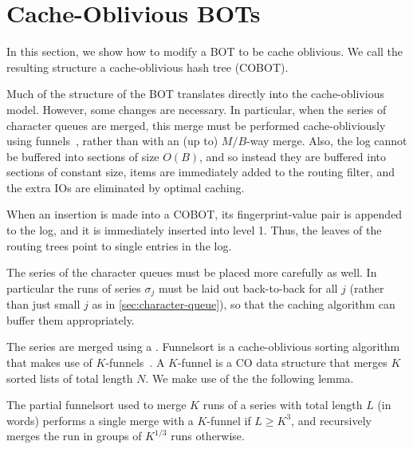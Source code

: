 \section{Cache-Oblivious BOTs}\label{sec:boa-cacheoblivious}

In this section, we show how to modify a BOT to be cache oblivious.  We call
the resulting structure a cache-oblivious hash tree (COBOT). 

Much of the structure of the BOT translates directly into the cache-oblivious
model. However, some changes are necessary. In particular, when the series of
character queues are merged, this merge must be performed cache-obliviously
using funnels~\cite{DBLP:conf/focs/FrigoLPR99}, rather than with an (up to)
$M/B$-way merge. Also, the log cannot be buffered into sections of size $O(B)$,
and so instead they are buffered into sections of constant size, items are
immediately added to the routing filter, and the extra IOs are eliminated by
optimal caching.

When an insertion is made into a COBOT, its fingerprint-value pair is
appended to the log, and it is immediately inserted into level 1. Thus, the
leaves of the routing trees point to single entries in the log.

The series of the character queues must be placed more carefully as well. In
particular the runs of series $\sigma_j$ must be laid out back-to-back for all
$j$ (rather than just small $j$ as in \cref{sec:character-queue}), so that the
caching algorithm can buffer them appropriately.

The series are merged using a . Funnelsort is a
cache-oblivious sorting algorithm that makes use of
$K$-funnels~\cite{DBLP:conf/focs/FrigoLPR99}. A $K$-funnel is a CO data structure
that merges $K$ sorted lists of total length $N$. We make use of the the
following lemma.

	
The partial funnelsort used to merge $K$ runs of a series with total length $L$
(in words) performs a single merge with a $K$-funnel if $L \geq K^3$, and
recursively merges the run in groups of $K^{1/3}$ runs otherwise.

